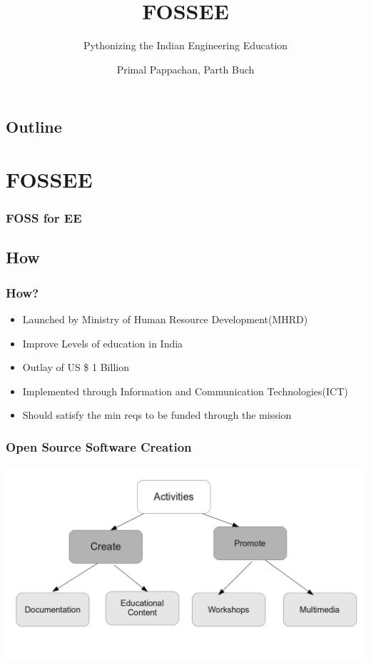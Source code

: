 \documentclass[compress,red]{beamer} %
\title{FOSSEE}
\subtitle{Pythonizing the Indian Engineering Education}
\author[]{Primal Pappachan, Parth Buch}  %
\institute{IIT Bombay}
\date[]{} %
\begin{document}
\begin{frame}
	 \titlepage
\end{frame}

\begin{frame}
\section*{Outline}
\tableofcontents
\end{frame}

\section{FOSSEE}
\begin{frame}
\frametitle{FOSS for EE}
\end{frame}

\subsection{How}
\begin{frame}
\frametitle{How?}
\begin{itemize}
\item Launched by Ministry of Human Resource Development(MHRD)
\item Improve Levels of education in India
\item Outlay of US \$ 1 Billion
\item Implemented through Information and Communication Technologies(ICT)
\item Should satisfy the min reqs to be funded through the mission
\end{itemize}
\end{frame}


\begin{frame}
\frametitle{Open Source Software Creation}
\includegraphics[scale=.30]{tree.png}
\end{frame}
\end{document}
